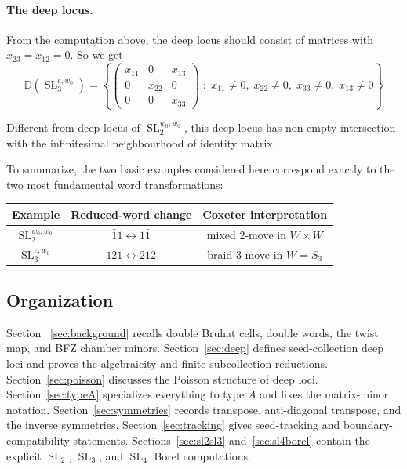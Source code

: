 \documentclass[12pt]{amsart}
\newcommand{\D}{\mathbb D}
\newcommand{\SL}{\operatorname{SL}}
\theoremstyle{plain}
\theoremstyle{definition}
\theoremstyle{remark}
\begin{document}
\medskip

\paragraph{\bf The deep locus.} From the computation above, the deep locus should consist of matrices with $x_{23}=x_{12}=0$. So we get
$$\D(\SL_3^{e,w_0})=\left\{ 
\begin{pmatrix}
x_{11} & 0 & x_{13}\\
0 & x_{22} & 0\\
0 & 0 & x_{33}
\end{pmatrix}\; : \; x_{11}\neq 0,\; x_{22}\neq 0,\; x_{33}\neq 0,\; x_{13}\neq 0 \right\}
$$

Different from deep locus of $\SL_2^{w_0,w_0}$, this deep locus has non-empty intersection with the infinitesimal neighbourhood of identity matrix.

To summarize, the two basic examples considered here correspond exactly to the two most fundamental word transformations:

\begin{center}
\begin{tabular}{c|c|c}
Example & Reduced-word change & Coxeter interpretation \\
\hline
$\SL_2^{w_0,w_0}$ & $\bar{1}1 \leftrightarrow 1\bar{1}$ & mixed $2$-move in $W\times W$ \\
$\SL_3^{e,w_0}$ & $121 \leftrightarrow 212$ & braid $3$-move in $W=S_3$
\end{tabular}
\end{center}


\subsection{Organization}

Section ~\ref{sec:background} recalls double Bruhat cells, double words, the twist map, and BFZ chamber minors.  Section~\ref{sec:deep} defines seed-collection deep loci and proves the algebraicity and finite-subcollection reductions. Section~\ref{sec:poisson} discusses the Poisson structure of deep loci. Section~\ref{sec:typeA} specializes everything to type $A$ and fixes the matrix-minor notation.  Section~\ref{sec:symmetries} records transpose, anti-diagonal transpose, and the inverse symmetries.  Section~\ref{sec:tracking} gives seed-tracking and boundary-compatibility statements.  Sections~\ref{sec:sl2sl3} and~\ref{sec:sl4borel} contain the explicit $\SL_2$, $\SL_3$, and $\SL_4$ Borel computations.  
\end{document}
